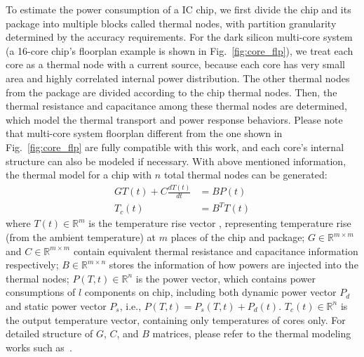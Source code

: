 To estimate the power consumption of a IC chip, we first divide the chip and its package into multiple blocks called thermal nodes, with partition granularity determined by the accuracy requirements. For the dark silicon multi-core system (a 16-core chip's floorplan example is shown in Fig.~\ref{fig:core_flp}), we treat each core as a thermal node with a current source, because each core has very small area and highly correlated internal power distribution. The other thermal nodes from the package are divided according to the chip thermal nodes. Then, the thermal resistance and capacitance among these thermal nodes are determined, which model the thermal transport and power response behaviors. Please note that multi-core system floorplan different from the one shown in Fig.~\ref{fig:core_flp} are fully compatible with this work, and each core's internal structure can also be modeled if necessary. With above mentioned information, the thermal model for a chip with $n$ total thermal nodes can be generated:
\begin{equation}\label{eq:gt}
\begin{split}
GT(t) + C\frac{dT(t)}{dt} &= BP(t)\\
T_{c}(t) &= B^{T}T(t)
\end{split}
\end{equation}
where $T(t) \in \mathbb{R}^m$ is the temperature rise vector , representing temperature rise (from the ambient temperature) at $m$ places of the chip and package; $G \in \mathbb{R}^{m\times m}$ and  $C \in \mathbb{R}^{m \times m}$ contain equivalent thermal resistance and capacitance information respectively; $B \in \mathbb{R}^{m \times n}$ stores the information of how powers are injected into the thermal nodes; $P(T, t) \in \mathbb{R}^{n}$ is the power vector, which contains power consumptions of $l$ components on chip, including both dynamic power vector $P_d$ and static power vector $P_s$, i.e., $P(T, t)=P_s(T, t)+P_d(t)$. $T_{c}(t) \in \mathbb{R}^n$ is the output temperature vector, containing only temperatures of cores only. For detailed structure of $G$, $C$, and $B$ matrices, please refer to the thermal modeling works such as~\cite{Huang:TVLSI'06,Huang:TC'08,WangTan:TODAES'13,Hanumaiah:TCAD'11}.